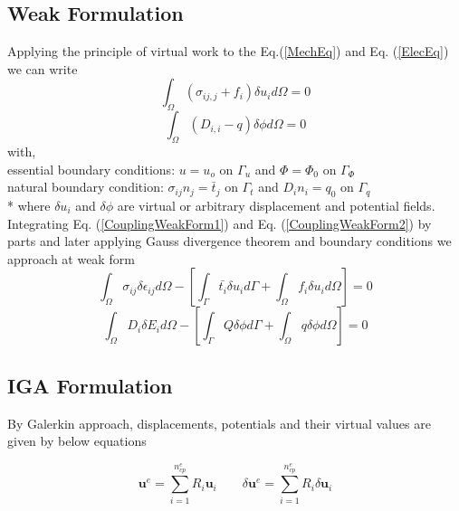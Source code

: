 \documentclass[11pt]{article}
\begin{document}
\subsection{Weak Formulation}
Applying the principle of virtual work to the Eq.(\ref{MechEq})
and Eq. (\ref{ElecEq}) we can write \cite{nguyen2018finite}
\begin{equation} \label{CouplingWeakForm1}
\int_\Omega ( \sigma_{ij,j} + f_i ) \delta u_i d\Omega = 0  
\end{equation}
\begin{equation} \label{CouplingWeakForm2}
\int_\Omega (D_{i,i} - q ) \delta \phi d\Omega = 0
\end{equation}
with, \\
essential boundary conditions:
$u = u_o$ on $\Gamma_u$ and $\Phi=\Phi_0$ on $\Gamma_\Phi$ \\
natural boundary condition:
$\sigma_{ij}n_j = \bar{t}_j$ on $\Gamma_t$ and $D_i n_i = q_0$ on $\Gamma_q$ \\*
where $\delta u_i$ and $\delta \phi$ are virtual or arbitrary displacement and
potential fields. \\
Integrating Eq. (\ref{CouplingWeakForm1}) and Eq. (\ref{CouplingWeakForm2}) by
parts and later applying Gauss divergence theorem and boundary conditions we
approach at weak form
\begin{equation} \label{FinalCouplingWeakForm1}
\int_\Omega \sigma_{ij} \delta \epsilon_{ij} d\Omega - \left[ \int_{\Gamma}
\bar{t_i} \delta u_i d\Gamma + \int_\Omega f_i \delta u_i d\Omega  \right]= 0 
\end{equation}
\begin{equation} \label{FinalCouplingWeakForm2}
\int_\Omega D_i \delta E_i d\Omega - \left[ \int_{\Gamma} Q \delta \phi d\Gamma
+ \int_\Omega q \delta \phi d\Omega \right] = 0
\end{equation}


\subsection{IGA Formulation}
By Galerkin approach, displacements, potentials and their virtual values are
given by below equations \cite{agrawal2019iga}

\begin{equation} \label{u_and_du_2}
\textbf{u}^e = \sum_{i=1}^{n_{cp}^e} R_i \textbf{u}_i \qquad \delta\textbf{u}^e
= \sum_{i=1}^{n_{cp}^e} R_i \delta\textbf{u}_i
\end{equation}
\end{document}
